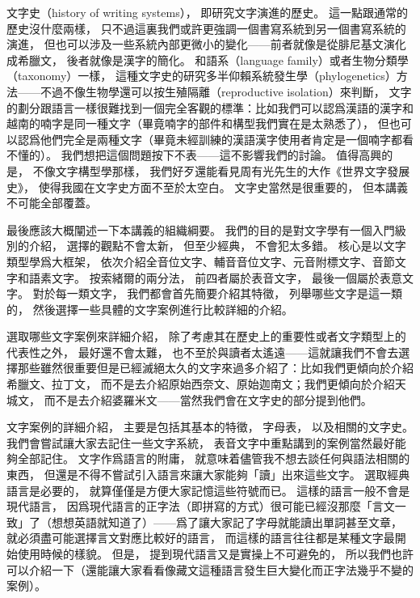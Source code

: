 文字史（history of writing systems），
即研究文字演進的歷史。
這一點跟通常的歷史沒什麼兩樣，
只不過這裏我們或許更強調一個書寫系統到另一個書寫系統的演進，
但也可以涉及一些系統內部更微小的變化——前者就像是從腓尼基文演化成希臘文，
後者就像是漢字的簡化。
和語系（language family）或者生物分類學（taxonomy）一樣，
這種文字史的研究多半仰賴系統發生學（phylogenetics）方法——不過不像生物學還可以按生殖隔離（reproductive isolation）來判斷，
文字的劃分跟語言一樣很難找到一個完全客觀的標準：比如我們可以認爲漢語的漢字和越南的喃字是同一種文字（畢竟喃字的部件和構型我們實在是太熟悉了），
但也可以認爲他們完全是兩種文字（畢竟未經訓練的漢語漢字使用者肯定是一個喃字都看不懂的）。
我們想把這個問題按下不表——這不影響我們的討論。
值得高興的是，
不像文字構型學那樣，
我們好歹還能看見周有光先生的大作《世界文字發展史》，
使得我國在文字史方面不至於太空白。
文字史當然是很重要的，
但本講義不可能全部覆蓋。


最後應該大概闡述一下本講義的組織綱要。
我們的目的是對文字學有一個入門級別的介紹，
選擇的觀點不會太新，
但至少經典，
不會犯太多錯。
核心是以文字類型學爲大框架，
依次介紹全音位文字、輔音音位文字、元音附標文字、音節文字和語素文字。
按索緒爾的兩分法，
前四者屬於表音文字，
最後一個屬於表意文字。
對於每一類文字，
我們都會首先簡要介紹其特徵，
列舉哪些文字是這一類的，
然後選擇一些具體的文字案例進行比較詳細的介紹。


選取哪些文字案例來詳細介紹，
除了考慮其在歷史上的重要性或者文字類型上的代表性之外，
最好還不會太難，
也不至於與讀者太遙遠——這就讓我們不會去選擇那些雖然很重要但是已經滅絕太久的文字來過多介紹了：比如我們更傾向於介紹希臘文、拉丁文，
而不是去介紹原始西奈文、原始迦南文；我們更傾向於介紹天城文，
而不是去介紹婆羅米文——當然我們會在文字史的部分提到他們。


文字案例的詳細介紹，
主要是包括其基本的特徵，
字母表，
以及相關的文字史。
我們會嘗試讓大家去記住一些文字系統，
表音文字中重點講到的案例當然最好能夠全部記住。
文字作爲語言的附庸，
就意味着儘管我不想去談任何與語法相關的東西，
但還是不得不嘗試引入語言來讓大家能夠「讀」出來這些文字。
選取經典語言是必要的，
就算僅僅是方便大家記憶這些符號而已。
這樣的語言一般不會是現代語言，
因爲現代語言的正字法（即拼寫的方式）很可能已經沒那麼「言文一致」了（想想英語就知道了）——爲了讓大家記了字母就能讀出單詞甚至文章，
就必須盡可能選擇言文對應比較好的語言，
而這樣的語言往往都是某種文字最開始使用時候的樣貌。
但是，
提到現代語言又是實操上不可避免的，
所以我們也許可以介紹一下（還能讓大家看看像藏文這種語言發生巨大變化而正字法幾乎不變的案例）。